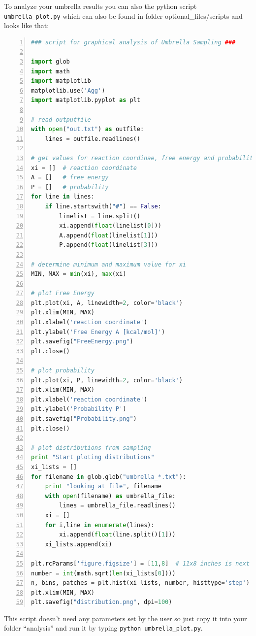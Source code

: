 \documentclass[a4paper,11pt]{scrartcl}
\begin{document}
To analyze your umbrella results you can also the python script \texttt{umbrella\_plot.py} which can also be found in folder optional\_files/scripts and looks like that:
\begin{lstlisting}[frame=single,language=python,basicstyle=\footnotesize,commentstyle=\color{red},keywordstyle=\color{blue},stringstyle=\color{mygreen},numbers=left,escapechar=|]
### script for graphical analysis of Umbrella Sampling ###

import glob
import math
import matplotlib
matplotlib.use('Agg')
import matplotlib.pyplot as plt

# read outputfile
with open("out.txt") as outfile:
    lines = outfile.readlines()

# get values for reaction coordinae, free energy and probability
xi = []  # reaction coordinate
A = []   # free energy
P = []   # probability
for line in lines:
    if line.startswith("#") == False:
        linelist = line.split()
        xi.append(float(linelist[0]))
        A.append(float(linelist[1]))
        P.append(float(linelist[3]))

# determine minimum and maximum value for xi
MIN, MAX = min(xi), max(xi)

# plot Free Energy
plt.plot(xi, A, linewidth=2, color='black')
plt.xlim(MIN, MAX)
plt.xlabel('reaction coordinate')
plt.ylabel('Free Energy A [kcal/mol]')
plt.savefig("FreeEnergy.png")
plt.close()

# plot probability
plt.plot(xi, P, linewidth=2, color='black')
plt.xlim(MIN, MAX)
plt.xlabel('reaction coordinate')
plt.ylabel('Probability P')
plt.savefig("Probability.png")
plt.close()

# plot distributions from sampling
print "Start ploting distributions"
xi_lists = []
for filename in glob.glob("umbrella_*.txt"):
    print "looking at file", filename
    with open(filename) as umbrella_file:
        lines = umbrella_file.readlines()
    xi = []
    for i,line in enumerate(lines):
        xi.append(float(line.split()[1]))
    xi_lists.append(xi)

plt.rcParams['figure.figsize'] = [11,8]  # 11x8 inches is next to DinA4
number = int(math.sqrt(len(xi_lists[0])))
n, bins, patches = plt.hist(xi_lists, number, histtype='step')
plt.xlim(MIN, MAX)
plt.savefig("distribution.png", dpi=100)  
\end{lstlisting}

This script doesn't need any parameters set by the user so just copy it into your folder ``analysis'' and run it by typing \texttt{python umbrella\_plot.py}. 
\end{document}
